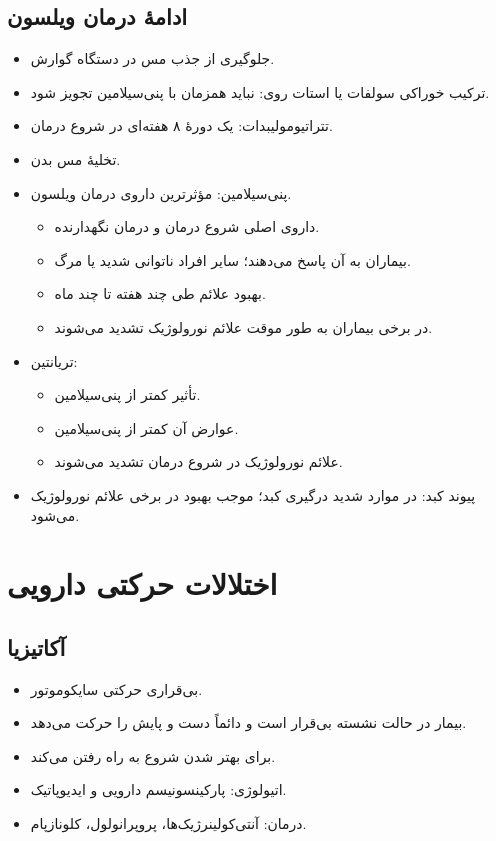 \documentclass[a4paper,12pt]{extbook}
\begin{document}
\subsection*{ادامهٔ درمان ویلسون}
\begin{itemize}
\item جلوگیری از جذب مس در دستگاه گوارش.
\item ترکیب خوراکی سولفات یا استات روی: نباید همزمان با پنی‌سیلامین تجویز شود.
\item تترا‌تیومولیبدات: یک دورهٔ ۸ هفته‌ای در شروع درمان.
\item تخلیهٔ مس بدن.
\item پنی‌سیلامین: مؤثرترین داروی درمان ویلسون.
\begin{itemize}
\item داروی اصلی شروع درمان و درمان نگهدارنده.
\item {} بیماران به آن پاسخ می‌دهند؛ سایر افراد ناتوانی شدید یا مرگ.
\item بهبود علائم طی چند هفته تا چند ماه.
\item در برخی بیماران به طور موقت علائم نورولوژیک تشدید می‌شوند.
\end{itemize}
\item تریانتین:
\begin{itemize}
\item تأثیر کمتر از پنی‌سیلامین.
\item عوارض آن کمتر از پنی‌سیلامین.
\item علائم نورولوژیک در شروع درمان تشدید می‌شوند.
\end{itemize}
\item پیوند کبد: در موارد شدید درگیری کبد؛ موجب بهبود در برخی علائم نورولوژیک می‌شود.
\end{itemize}
\section*{اختلالات حرکتی دارویی}
\subsection*{آکاتیزیا}
\begin{itemize}
\item بی‌قراری حرکتی سایکوموتور.
\item بیمار در حالت نشسته بی‌قرار است و دائماً دست و پایش را حرکت می‌دهد.
\item برای بهتر شدن شروع به راه رفتن می‌کند.
\item اتیولوژی: پارکینسونیسم دارویی و ایدیوپاتیک.
\item درمان: آنتی‌کولینرژیک‌ها، پروپرانولول، کلونازپام.
\end{itemize}
\end{document}
